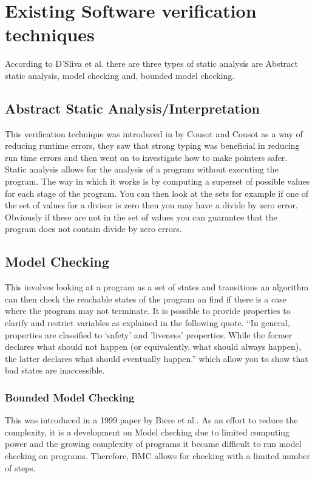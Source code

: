 \documentclass[a4paper,12pt]{scrartcl}
\begin{document}
	\section{Existing Software verification techniques}
	{
		According to D'Sliva et al. there are three types of static analysis are Abstract static analysis, model checking and, bounded model checking\cite{DSilva2008}. 
		\subsection{Abstract Static Analysis/Interpretation}
		{
			This verification technique was introduced in \cite{Cousot1977} by Cousot and Cousot as a way of reducing runtime errors, they saw that strong typing was beneficial in reducing run time errors and then went on to investigate how to make pointers safer. Static analysis allows for the analysis of a program without executing the program. The way in which it works is by computing a superset of possible values for each stage of the program. You can then look at the sets for example if one of the set of values for a divisor is zero then you may have a divide by zero error. Obviously if these are not in the set of values you can guarantee that the program does not contain divide by zero errors.
		}
		\subsection{Model Checking}
		{
			This involves looking at a program as a set of states and transitions an algorithm can then check the reachable states of the program an find if there is a case where the program may not terminate\cite{DSilva2008}. It is possible to provide properties to clarify and restrict variables as explained in the following quote. \enquote{In general, properties are classified to ‘safety’ and ’liveness’ properties. While the former declares what should not happen (or equivalently, what should always happen), the latter declares what should eventually happen.}\cite{Biere2003} which allow you to show that bad states are inaccessible.
			\subsubsection{Bounded Model Checking}
			{
				This was introduced in a 1999 paper by Biere et al.\cite{Biere1999}. As an effort to reduce the complexity, it is a development on Model checking due to limited computing power and the growing complexity of programs it became difficult to run model checking on programs. Therefore, BMC allows for checking with a limited number of steps.
			}
		}

	}
	
\end{document}

